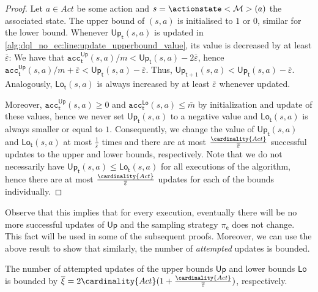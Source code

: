 \documentclass{theoretics}
\newcommand{\MDP}{\mathcal{M}}
\newcommand{\Actions}{Act}
\newcommand{\strategy}{\pi}
\newcommand{\upperbound}{\mathsf{Up}}
\newcommand{\lowerbound}{\mathsf{Lo}}
\newcommand{\updatestep}{{\overline{\varepsilon}}}
\newcommand{\delay}{{\overline{m}}}
\newcommand{\updatecount}{{\overline{\xi}}}
\newcommand{\acc}{\texttt{acc}}
\newcommand{\algostep}{\mathsf{t}}
\newcommand{\algoepisode}{\mathsf{e}}
\begin{document}
\begin{proof}
	Let $a \in \Actions$ be some action and $s = \actionstate<\MDP>(a)$ the associated state.
	The upper bound of $(s, a)$ is initialised to $1$ or $0$, similar for the lower bound.
	Whenever $\upperbound_\algostep(s, a)$ is updated in \cref{alg:dql_no_ec:line:update_upperbound_value}, its value is decreased by at least $\updatestep$:
	We have that $\acc_\algostep^\upperbound(s, a) / m < \upperbound_\algostep(s, a) - 2 \updatestep$, hence $\acc_\algostep^\upperbound(s, a) / m + \updatestep < \upperbound_\algostep(s, a) - \updatestep$.
	Thus, $\upperbound_{\algostep+1}(s, a) < \upperbound_\algostep(s, a) - \updatestep$.
	Analogously, $\lowerbound_\algostep(s, a)$ is always increased by at least $\updatestep$ whenever updated.

	Moreover, $\acc_\algostep^\upperbound(s, a) \geq 0$ and $\acc_\algostep^\lowerbound(s, a) \leq \delay$ by initialization and update of these values, hence we never set $\upperbound_\algostep(s, a)$ to a negative value and $\lowerbound_\algostep(s, a)$ is always smaller or equal to $1$.
	Consequently, we change the value of $\upperbound_\algostep(s, a)$ and $\lowerbound_\algostep(s, a)$ at most $\frac{1}{\updatestep}$ times and there are at most $\frac{\cardinality{\Actions}}{\updatestep}$ successful updates to the upper and lower bounds, respectively.
	Note that we do not necessarily have $\upperbound_\algostep(s, a) \leq \lowerbound_\algostep(s, a)$ for all executions of the algorithm, hence there are at most $\frac{\cardinality{\Actions}}{\updatestep}$ updates for each of the bounds individually. 
\end{proof}
Observe that this implies that for every execution, eventually there will be no more successful updates of $\upperbound$ and the sampling strategy $\strategy_\algoepisode$ does not change.
This fact will be used in some of the subsequent proofs.
Moreover, we can use the above result to show that similarly, the number of \emph{attempted} updates is bounded.
\begin{lemma} \label{stm:dql_no_ec:attempted_update_count}
	The number of attempted updates of the upper bounds $\upperbound$ and lower bounds $\lowerbound$ is bounded by $\updatecount = 2 \cardinality{\Actions} (1 + \frac{\cardinality{\Actions}}{\updatestep})$, respectively.
\end{lemma}
\end{document}
